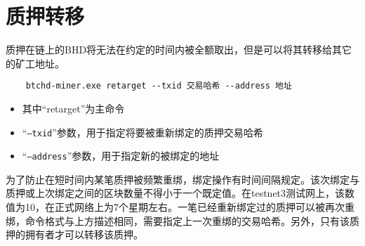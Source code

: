\section{质押转移}
\begin{flushleft}
    质押在链上的BHD将无法在约定的时间内被全额取出，但是可以将其转移给其它的矿工地址。
\end{flushleft}
\scriptsize
\begin{verbatim}
    btchd-miner.exe retarget --txid 交易哈希 --address 地址
\end{verbatim}
\normalsize
\begin{itemize}
    \item 其中``retarget''为主命令
    \item ``\texttt{--txid}''参数，用于指定将要被重新绑定的质押交易哈希
    \item ``\texttt{--address}''参数，用于指定新的被绑定的地址
\end{itemize}
\begin{flushleft}
    为了防止在短时间内某笔质押被频繁重绑，绑定操作有时间间隔规定。该次绑定与质押或上次绑定之间的区块数量不得小于一个既定值。在testnet3测试网上，该数值为10，在正式网络上为7个星期左右。一笔已经重新绑定过的质押可以被再次重绑，命令格式与上方描述相同，需要指定上一次重绑的交易哈希。另外，只有该质押的拥有者才可以转移该质押。
\end{flushleft}
